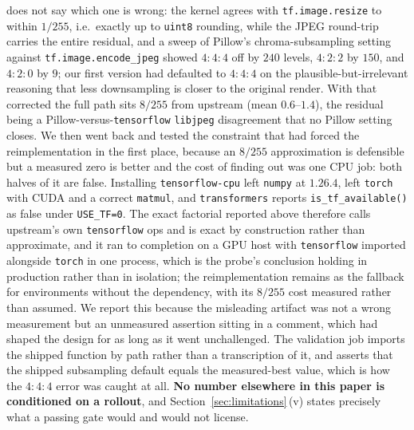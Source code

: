 \documentclass{article}
\begin{document}
does not say which one is wrong: the kernel agrees with \texttt{tf.image.resize} to within $1/255$, i.e.\ exactly up to \texttt{uint8} rounding, while the JPEG round-trip carries the entire residual, and a sweep of Pillow's chroma-subsampling setting against \texttt{tf.image.encode\_jpeg} showed $4{:}4{:}4$ off by $240$ levels, $4{:}2{:}2$ by $150$, and $4{:}2{:}0$ by $9$; our first version had defaulted to $4{:}4{:}4$ on the plausible-but-irrelevant reasoning that less downsampling is closer to the original render. With that corrected the full path sits $8/255$ from upstream (mean $0.6$--$1.4$), the residual being a Pillow-versus-\texttt{tensorflow} \texttt{libjpeg} disagreement that no Pillow setting closes. We then went back and tested the constraint that had forced the reimplementation in the first place, because an $8/255$ approximation is defensible but a measured zero is better and the cost of finding out was one CPU job: both halves of it are false. Installing \texttt{tensorflow-cpu} left \texttt{numpy} at $1.26.4$, left \texttt{torch} with CUDA and a correct \texttt{matmul}, and \texttt{transformers} reports \texttt{is\_tf\_available()} as false under \texttt{USE\_TF=0}. The exact factorial reported above therefore calls upstream's own \texttt{tensorflow} ops and is exact by construction rather than approximate, and it ran to completion on a GPU host with \texttt{tensorflow} imported alongside \texttt{torch} in one process, which is the probe's conclusion holding in production rather than in isolation; the reimplementation remains as the fallback for environments without the dependency, with its $8/255$ cost measured rather than assumed. We report this because the misleading artifact was not a wrong measurement but an unmeasured assertion sitting in a comment, which had shaped the design for as long as it went unchallenged. The validation job imports the shipped function by path rather than a transcription of it, and asserts that the shipped subsampling default equals the measured-best value, which is how the $4{:}4{:}4$ error was caught at all. \textbf{No number elsewhere in this paper is conditioned on a rollout}, and Section~\ref{sec:limitations}\,(v) states precisely what a passing gate would and would not license.
\end{document}
